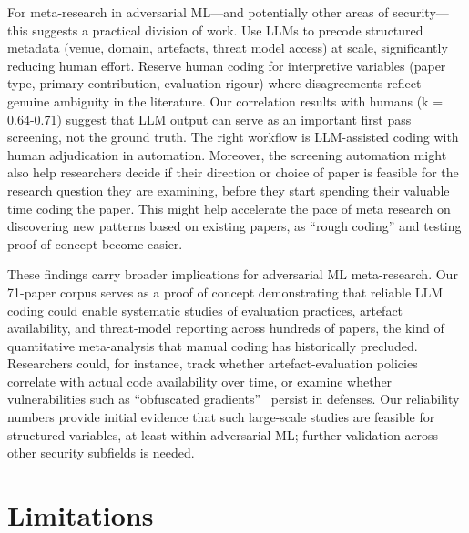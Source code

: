 \documentclass[conference,compsoc]{IEEEtran}
\begin{document}
For meta-research in adversarial ML---and potentially other areas of security---this suggests a practical division of work. Use LLMs to precode structured metadata (venue, domain, artefacts, threat model access) at scale, significantly reducing human effort. Reserve human coding for interpretive variables (paper type, primary contribution, evaluation rigour) where disagreements reflect genuine ambiguity in the literature.  Our correlation results with humans (k = 0.64-0.71) suggest that LLM output can serve as an important first pass screening, not the ground truth. The right workflow is LLM-assisted coding with human adjudication in automation. Moreover, the screening automation might also help researchers decide if their direction or choice of paper is feasible for the research question they are examining, before they start spending their valuable time coding the paper. This might help accelerate the pace of meta research on discovering new patterns based on existing papers, as ``rough coding'' and testing proof of concept become easier.

These findings carry broader implications for adversarial ML meta-research. Our 71-paper corpus serves as a proof of concept demonstrating that reliable LLM coding could enable systematic studies of evaluation practices, artefact availability, and threat-model reporting across hundreds of papers, the kind of quantitative meta-analysis that manual coding has historically precluded. Researchers could, for instance, track whether artefact-evaluation policies~\cite{usenixsec2025artifacts} correlate with actual code availability over time, or examine whether vulnerabilities such as ``obfuscated gradients''~\cite{athalye2018obfuscated} persist in defenses. Our reliability numbers provide initial evidence that such large-scale studies are feasible for structured variables, at least within adversarial ML; further validation across other security subfields is needed.

\section{Limitations}
\end{document}
